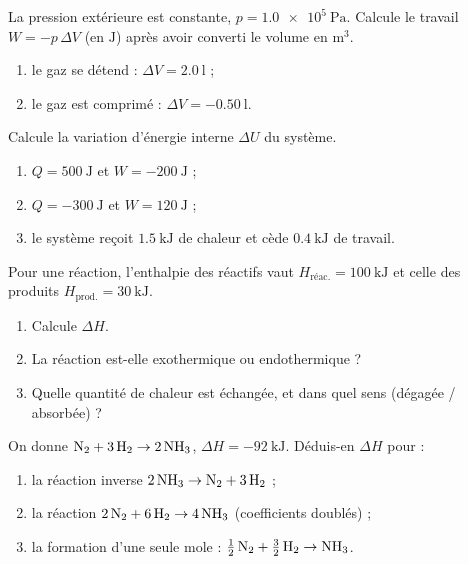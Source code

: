 \documentclass[11pt,a4paper]{article}
\begin{document}
\begin{exo}
La pression extérieure est constante, $p=\qty{1.0e5}{\pascal}$. Calcule le travail $W=-p\,\Delta V$ (en $\si{\joule}$) après avoir converti le volume en $\si{\cubic\metre}$.
\begin{enumerate}[label=\alph*)]
  \item le gaz se détend : $\Delta V = \qty{+2.0}{\litre}$ ;
  \item le gaz est comprimé : $\Delta V = \qty{-0.50}{\litre}$.
\end{enumerate}
\end{exo}

\begin{exo}[appliquer $\Delta U = Q + W$]
Calcule la variation d'énergie interne $\Delta U$ du système.
\begin{enumerate}[label=\alph*)]
  \item $Q=\qty{+500}{\joule}$ et $W=\qty{-200}{\joule}$ ;
  \item $Q=\qty{-300}{\joule}$ et $W=\qty{+120}{\joule}$ ;
  \item le système reçoit $\qty{1.5}{\kilo\joule}$ de chaleur et cède $\qty{0.4}{\kilo\joule}$ de travail.
\end{enumerate}
\end{exo}

\begin{exo}
Pour une réaction, l'enthalpie des réactifs vaut $H_{\text{réac.}}=\qty{100}{\kilo\joule}$ et celle des produits $H_{\text{prod.}}=\qty{30}{\kilo\joule}$.
\begin{enumerate}[label=\alph*)]
  \item Calcule $\Delta H$.
  \item La réaction est-elle exothermique ou endothermique ?
  \item Quelle quantité de chaleur est échangée, et dans quel sens (dégagée / absorbée) ?
\end{enumerate}
\end{exo}

\begin{exo}
On donne $\ce{N2} + 3\,\ce{H2} \rightarrow 2\,\ce{NH3}$, \; $\Delta H = \qty{-92}{\kilo\joule}$. Déduis-en $\Delta H$ pour :
\begin{enumerate}[label=\alph*)]
  \item la réaction inverse $2\,\ce{NH3} \rightarrow \ce{N2} + 3\,\ce{H2}$ ;
  \item la réaction $2\,\ce{N2} + 6\,\ce{H2} \rightarrow 4\,\ce{NH3}$ (coefficients doublés) ;
  \item la formation d'une seule mole : $\tfrac12\,\ce{N2} + \tfrac32\,\ce{H2} \rightarrow \ce{NH3}$.
\end{enumerate}
\end{exo}
\end{document}

